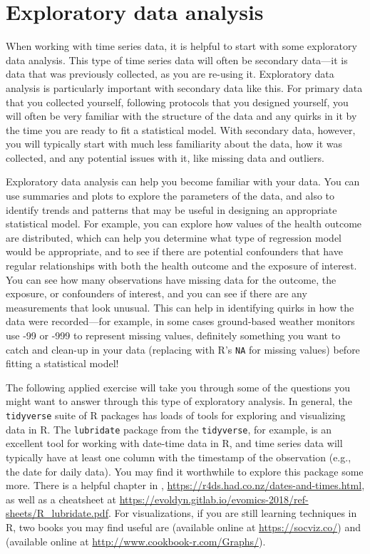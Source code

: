 \documentclass[
]{book}
\begin{document}
\hypertarget{exploratory-data-analysis}{%
\section{Exploratory data analysis}\label{exploratory-data-analysis}}

When working with time series data, it is helpful to start with some exploratory
data analysis. This type of time series data will often be secondary data---it is
data that was previously collected, as you are re-using it. Exploratory data analysis
is particularly important with secondary data like this. For primary data that you
collected yourself, following protocols that you designed yourself, you will often
be very familiar with the structure of the data and any quirks in it by the time
you are ready to fit a statistical model. With secondary data, however, you will
typically start with much less familiarity about the data, how it was collected, and
any potential issues with it, like missing data and outliers.

Exploratory data analysis can help you become familiar with your data. You can use
summaries and plots to explore the parameters of the data, and also to identify
trends and patterns that may be useful in designing an appropriate statistical
model. For example, you can explore how values of the health outcome are distributed,
which can help you determine what type of regression model would be appropriate, and
to see if there are potential confounders that have regular relationships with
both the health outcome and the exposure of interest. You can see how many
observations have missing data for the outcome, the exposure, or confounders of
interest, and you can see if there are any measurements that look unusual.
This can help in identifying quirks in how the data were recorded---for example,
in some cases ground-based weather monitors use -99 or -999 to represent missing
values, definitely something you want to catch and clean-up in your data
(replacing with R's \texttt{NA} for missing values) before fitting a statistical model!

The following applied exercise will take you through some of the
questions you might want to answer through this type of exploratory analysis.
In
general, the \texttt{tidyverse} suite of R packages has loads of tools for exploring and
visualizing data in R.
The \texttt{lubridate} package from the \texttt{tidyverse}, for example, is an excellent tool for working with date-time data
in R, and time series data will typically have at least one column with the
timestamp of the observation (e.g., the date for daily data).
You may find it worthwhile to explore this package some more. There is a helpful
chapter in \citet{wickham2016r}, \url{https://r4ds.had.co.nz/dates-and-times.html}, as well
as a cheatsheet at
\url{https://evoldyn.gitlab.io/evomics-2018/ref-sheets/R_lubridate.pdf}. For
visualizations, if you are still learning techniques in R, two books
you may find useful are
\citet{healy2018data} (available online at \url{https://socviz.co/}) and \citet{chang2018r}
(available online at \url{http://www.cookbook-r.com/Graphs/}).
\end{document}

